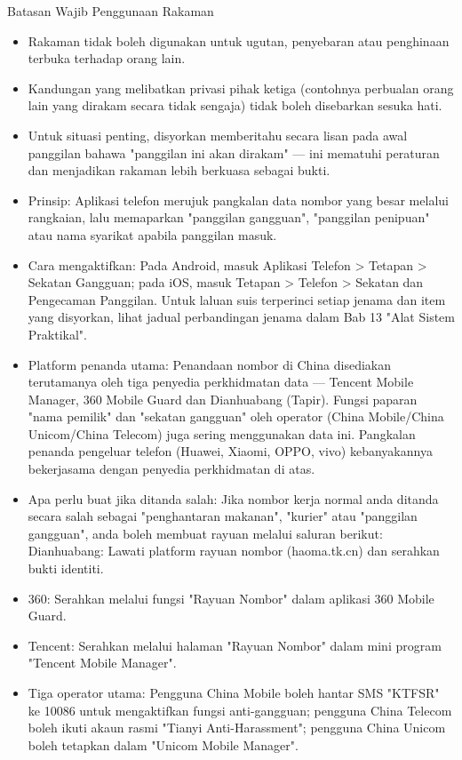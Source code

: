 \begin{tcbwarn}{Batasan Wajib Penggunaan Rakaman}
\begin{itemize}
  \item Rakaman tidak boleh digunakan untuk ugutan, penyebaran atau penghinaan terbuka terhadap orang lain.
  \item Kandungan yang melibatkan privasi pihak ketiga (contohnya perbualan orang lain yang dirakam secara tidak sengaja) tidak boleh disebarkan sesuka hati.
  \item Untuk situasi penting, disyorkan memberitahu secara lisan pada awal panggilan bahawa "panggilan ini akan dirakam" — ini mematuhi peraturan dan menjadikan rakaman lebih berkuasa sebagai bukti.
\end{itemize}

\end{tcbwarn}


\begin{itemize}
  \item Prinsip: Aplikasi telefon merujuk pangkalan data nombor yang besar melalui rangkaian, lalu memaparkan "panggilan gangguan", "panggilan penipuan" atau nama syarikat apabila panggilan masuk.
  \item Cara mengaktifkan: Pada Android, masuk Aplikasi Telefon > Tetapan > Sekatan Gangguan; pada iOS, masuk Tetapan > Telefon > Sekatan dan Pengecaman Panggilan. Untuk laluan suis terperinci setiap jenama dan item yang disyorkan, lihat jadual perbandingan jenama dalam Bab 13 "Alat Sistem Praktikal".
  \item Platform penanda utama: Penandaan nombor di China disediakan terutamanya oleh tiga penyedia perkhidmatan data — Tencent Mobile Manager, 360 Mobile Guard dan Dianhuabang (Tapir). Fungsi paparan "nama pemilik" dan "sekatan gangguan" oleh operator (China Mobile/China Unicom/China Telecom) juga sering menggunakan data ini. Pangkalan penanda pengeluar telefon (Huawei, Xiaomi, OPPO, vivo) kebanyakannya bekerjasama dengan penyedia perkhidmatan di atas.
  \item Apa perlu buat jika ditanda salah: Jika nombor kerja normal anda ditanda secara salah sebagai "penghantaran makanan", "kurier" atau "panggilan gangguan", anda boleh membuat rayuan melalui saluran berikut: Dianhuabang: Lawati platform rayuan nombor (haoma.tk.cn) dan serahkan bukti identiti.
  \item 360: Serahkan melalui fungsi "Rayuan Nombor" dalam aplikasi 360 Mobile Guard.
  \item Tencent: Serahkan melalui halaman "Rayuan Nombor" dalam mini program "Tencent Mobile Manager".
  \item Tiga operator utama: Pengguna China Mobile boleh hantar SMS "KTFSR" ke 10086 untuk mengaktifkan fungsi anti-gangguan; pengguna China Telecom boleh ikuti akaun rasmi "Tianyi Anti-Harassment"; pengguna China Unicom boleh tetapkan dalam "Unicom Mobile Manager".
\end{itemize}

